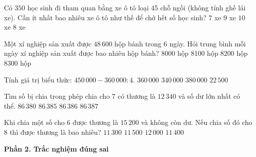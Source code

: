 \begin{ex} %
Có $350$ học sinh đi tham quan bằng xe ô tô loại 45 chỗ ngồi (không tính ghế lái xe). Cần ít nhất bao nhiêu xe ô tô như thế để chở hết số học sinh?
\choice
{$7$ xe}
{$9$ xe}
{$10$ xe}
{\True $8$ xe}
\end{ex}

\begin{ex} %
Một xí nghiệp sản xuất được $48\,600$ hộp bánh trong 6 ngày. Hỏi trung bình mỗi ngày xí nghiệp sản xuất được bao nhiêu hộp bánh?
\choice
{$8000$ hộp}
{\True $8100$ hộp}
{$8200$ hộp}
{$8300$ hộp}
\end{ex}

\begin{ex} %
Tính giá trị biểu thức: $450\,000 - 360\,000 : 4$.
\choice
{\True $360\,000$}
{$340\,000$}
{$380\,000$}
{$22\,500$}
\end{ex}

\begin{ex} %
Tìm số bị chia trong phép chia cho 7 có thương là $12\,340$ và số dư lớn nhất có thể.
\choice
{$86\,380$}
{$86\,385$}
{\True $86\,386$}
{$86\,387$}
\end{ex}

\begin{ex} %
Khi chia một số cho 6 được thương là $15\,200$ và không còn dư. Nếu chia số đó cho 8 thì được thương là bao nhiêu?
\choice
{$11\,300$}
{$11\,500$}
{$12\,000$}
{\True $11\,400$}
\end{ex}

\textbf{Phần 2. Trắc nghiệm đúng sai}

